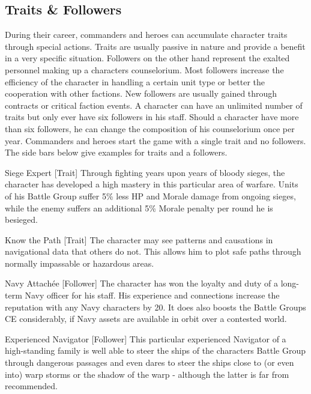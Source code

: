 \subsection{Traits \& Followers}
During their career, commanders and heroes can accumulate character traits through special actions. 
Traits are usually passive in nature and provide a benefit in a very specific situation. 
Followers on the other hand represent the exalted personnel making up a characters counselorium. 
Most followers increase the efficiency of the character in handling a certain unit type or better the cooperation with other factions. 
New followers are usually gained through contracts or critical faction events. 
A character can have an unlimited number of traits but only ever have six followers in his staff. 
Should a character have more than six followers, he can change the composition of his counselorium once per year. 
Commanders and heroes start the game with a single trait and no followers.
The side bars below give examples for traits and a followers.
\begin{DndSidebar}{Siege Expert [Trait]}
Through fighting years upon years of bloody sieges, the character has developed a high mastery in this particular area of warfare.
Units of his Battle Group suffer 5\% less HP and Morale damage from ongoing sieges, while the enemy suffers an additional 5\% Morale penalty per round he is besieged.
\end{DndSidebar}
\begin{DndSidebar}{Know the Path [Trait]}
The character may see patterns and causations in navigational data that others do not. This allows him to plot safe paths through normally impassable or hazardous areas. 
\end{DndSidebar}
\begin{DndSidebar}{Navy Attachée [Follower]}
The character has won the loyalty and duty of a long-term Navy officer for his staff. His experience and connections increase the reputation with any Navy characters by 20. It does also boosts the Battle Groups CE considerably, if Navy assets are available in orbit over a contested world.
\end{DndSidebar}
\begin{DndSidebar}{Experienced Navigator [Follower]}
This particular experienced Navigator of a high-standing family is well able to steer the ships of the characters Battle Group through dangerous passages and even dares to steer the ships close to (or even into) warp storms or the shadow of the warp - although the latter is far from recommended.
\end{DndSidebar}



